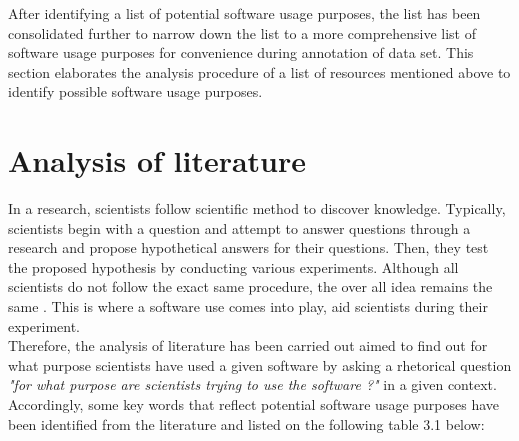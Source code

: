 After identifying a list of potential software usage purposes, the list has been consolidated further to narrow down the list to a more comprehensive list of software usage purposes for convenience during annotation of data set. This section elaborates the analysis procedure of a list of resources mentioned above to identify possible software usage purposes. \\
 

\section{Analysis of literature }
\label{sec:purpose:literatures}

In a research, scientists follow scientific method to discover knowledge. Typically, scientists begin with a question and attempt to answer questions through a research and propose hypothetical answers for their questions. Then, they test the proposed hypothesis by conducting various experiments. Although all scientists do not follow the exact same procedure, the over all idea remains the same \citep{enwiki:1061107378}. This is where a software use comes into play, aid scientists during their experiment. \\

Therefore, the analysis of literature has been carried out aimed to find out for what purpose scientists have used a given software by asking a rhetorical question \emph{ "for what purpose are scientists trying to use the software ?"} in a given context. \\

Accordingly, some key words that reflect potential software usage purposes have been identified from the literature and listed on the following table 3.1 below: \\

